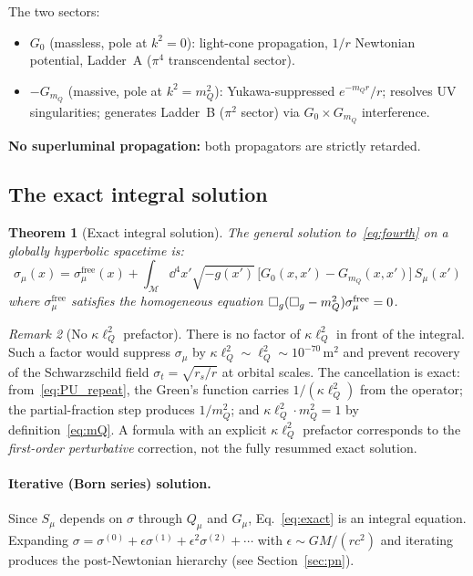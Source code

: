 \documentclass[11pt,a4paper]{article}
\theoremstyle{plain}
\newtheorem{theorem}{Theorem}[section]
\theoremstyle{definition}
\theoremstyle{remark}
\newtheorem{remark}[theorem]{Remark}
\newcommand{\sigt}{\sigma_t}
\newcommand{\rs}{r_s}
\newcommand{\lQ}{\ell_Q}
\newcommand{\mQ}{m_Q}
\newcommand{\boxg}{\square_g}
\begin{document}
The two sectors:
\begin{itemize}[nosep]
  \item $G_0$ (massless, pole at $k^2=0$): light-cone propagation, $1/r$ Newtonian potential, Ladder~A ($\pi^4$ transcendental sector).
  \item $-G_{\mQ}$ (massive, pole at $k^2=\mQ^2$): Yukawa-suppressed $e^{-\mQ r}/r$;
    resolves UV singularities; generates Ladder~B ($\pi^2$ sector) via $G_0\times G_{\mQ}$ interference.
\end{itemize}

\textbf{No superluminal propagation:} both propagators are strictly retarded.

\subsection{The exact integral solution}

\begin{theorem}[Exact integral solution]
\label{thm:exact}
The general solution to~\eqref{eq:fourth} on a globally hyperbolic spacetime is:
\begin{equation}
  \sigma_\mu(x) = \sigma_\mu^{\mathrm{free}}(x)
    + \int_{\mathcal{M}}\!\dd^4x'\sqrt{-g(x')}\,
      \bigl[G_0(x,x') - G_{\mQ}(x,x')\bigr]\,S_\mu(x')
  \label{eq:exact}
\end{equation}
where $\sigma_\mu^{\mathrm{free}}$ satisfies the homogeneous equation
$\boxg(\boxg - \mQ^2)\sigma_\mu^{\rm free} = 0$.
\end{theorem}

\begin{remark}[No $\kappa\lQ^2$ prefactor]
There is no factor of $\kappa\lQ^2$ in front of the integral.  Such a factor would
suppress $\sigma_\mu$ by $\kappa\lQ^2\sim\lQ^2\sim 10^{-70}\,\mathrm{m}^2$ and prevent
recovery of the Schwarzschild field $\sigt = \sqrt{\rs/r}$ at orbital scales.  The
cancellation is exact: from~\eqref{eq:PU_repeat}, the Green's function carries
$1/(\kappa\lQ^2)$ from the operator; the partial-fraction step produces $1/\mQ^2$;
and $\kappa\lQ^2\cdot\mQ^2 = 1$ by definition~\eqref{eq:mQ}.  A formula with an
explicit $\kappa\lQ^2$ prefactor corresponds to the \emph{first-order perturbative}
correction, not the fully resummed exact solution.
\end{remark}

\paragraph{Iterative (Born series) solution.}
Since $S_\mu$ depends on $\sigma$ through $Q_\mu$ and $G_\mu$,
Eq.~\eqref{eq:exact} is an integral equation.  Expanding
$\sigma = \sigma^{(0)} + \epsilon\sigma^{(1)} + \epsilon^2\sigma^{(2)} + \cdots$
with $\epsilon \sim GM/(rc^2)$ and iterating produces the post-Newtonian hierarchy
(see Section~\ref{sec:pn}).
\end{document}
